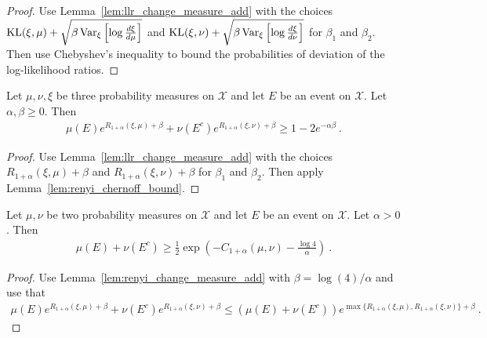 \begin{proof} %
{}
Use Lemma~\ref{lem:llr_change_measure_add} with the choices $\operatorname{KL}(\xi, \mu) + \sqrt{\beta \operatorname{Var}_{\xi}\left[\log\frac{d\xi}{d\mu}\right]}$ and $\operatorname{KL}(\xi, \nu) + \sqrt{\beta \operatorname{Var}_{\xi}\left[\log\frac{d\xi}{d\nu}\right]}$ for $\beta_1$ and $\beta_2$.
Then use Chebyshev's inequality to bound the probabilities of deviation of the log-likelihood ratios.
\end{proof}

\begin{lemma}
  \label{lem:renyi_change_measure_add}
  \leanok
  Let $\mu, \nu, \xi$ be three probability measures on $\mathcal X$ and let $E$ be an event on $\mathcal X$. Let $\alpha, \beta \ge 0$. Then
  \begin{align*}
  \mu(E) e^{R_{1+\alpha}(\xi, \mu) + \beta} + \nu(E^c) e^{R_{1+\alpha}(\xi, \nu) + \beta} \ge 1 - 2 e^{-\alpha \beta} \: .
  \end{align*}
\end{lemma}

\begin{proof}\leanok
{}
Use Lemma~\ref{lem:llr_change_measure_add} with the choices $R_{1+\alpha}(\xi, \mu) + \beta$ and $R_{1+\alpha}(\xi, \nu) + \beta$ for $\beta_1$ and $\beta_2$.
Then apply Lemma~\ref{lem:renyi_chernoff_bound}.
\end{proof}


\begin{lemma}
  \label{lem:testing_bound_renyi_one_add}
  \leanok
  Let $\mu, \nu$ be two probability measures on $\mathcal X$ and let $E$ be an event on $\mathcal X$. Let $\alpha > 0$. Then
  \begin{align*}
  \mu(E) + \nu(E^c) \ge \frac{1}{2}\exp\left( - C_{1+\alpha}(\mu, \nu) - \frac{\log 4}{\alpha}\right) \: .
  \end{align*}
\end{lemma}

\begin{proof}%
{}
Use Lemma~\ref{lem:renyi_change_measure_add} with $\beta = \log(4)/\alpha$ and use that
\begin{align*}
\mu(E) e^{R_{1+\alpha}(\xi, \mu) + \beta} + \nu(E^c) e^{R_{1+\alpha}(\xi, \nu) + \beta}
\le (\mu(E) + \nu(E^c)) e^{\max \{R_{1+\alpha}(\xi, \mu), R_{1+\alpha}(\xi, \nu)\} + \beta}
\: .
\end{align*}

\end{proof}



